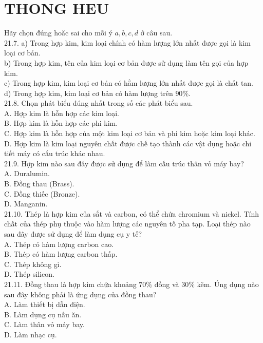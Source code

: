 \documentclass[10pt]{article}
\begin{document}
\section*{THONG HEU}
Hãy chọn đúng hoăc sai cho mỗi ý $a, b, c, d$ ở câu sau.\\
21.7. a) Trong hợp kim, kim loại chính có hàm lượng lớn nhất được gọi là kim loại cơ bản.\\
b) Trong hợp kim, tên của kim loại cơ bản được sử dụng làm tên gọi của hợp kim.\\
c) Trong hợp kim, kim loại cơ bản có hằm lượng lớn nhất được gọi là chất tan.\\
d) Trong hợp kim, kim loại cơ bản có hàm lượng trên $90 \%$.\\
21.8. Chọn phát biểu đúng nhất trong số các phát biểu sau.\\
A. Hợp kim là hỗn hợp các kim loại.\\
B. Hợp kim là hỗn hợp các phi kim.\\
C. Hợp kim là hỗn hợp của một kim loại cơ bản và phi kim hoặc kim loại khác.\\
D. Hợp kim là kim loại nguyên chất được chế tạo thành các vật dụng hoặc chi tiết máy có cấu trúc khác nhau.\\
21.9. Hợp kim nào sau đây được sử dụng để làm cấu trúc thân vỏ máy bay?\\
A. Duralumin.\\
B. Đồng thau (Brass).\\
C. Đồng thiếc (Bronze).\\
D. Manganin.\\
21.10. Thép là hợp kim của sắt và carbon, có thể chứa chromium và nickel. Tính chất của thép phụ thuộc vào hàm lượng các nguyên tố pha tạp. Loại thép nào sau đây được sử dụng để làm dụng cụ y tế?\\
A. Thép có hàm lượng carbon cao.\\
B. Thép có hàm lượng carbon thấp.\\
C. Thép không gỉ.\\
D. Thép silicon.\\
21.11. Đồng thau là hợp kim chứa khoảng $70 \%$ đồng và $30 \%$ kẽm. Úng dụng nào sau đây không phải là ứng dụng của đồng thau?\\
A. Làm thiết bị dẫn điện.\\
B. Làm dụng cụ nấu ăn.\\
C. Làm thân vỏ máy bay.\\
D. Làm nhạc cụ.
\end{document}
